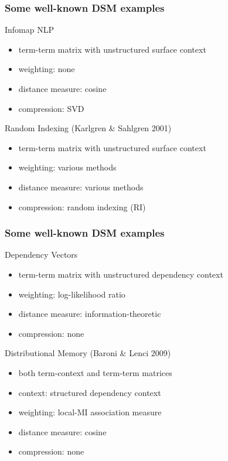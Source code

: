 \begin{frame}
  \frametitle{Some well-known DSM examples}

  \ungap
  \begin{block} {Infomap NLP \citep{Widdows:04}}
  \begin{itemize}
  \item term-term matrix with unstructured surface context
  \item weighting: none
  \item distance measure: cosine
  \item compression: SVD
  \end{itemize}
  \end{block}
 
  \begin{block} {Random Indexing (Karlgren \& Sahlgren 2001)}
    \begin{itemize}
    \item term-term matrix with unstructured surface context
    \item weighting: various methods 
    \item distance measure: various methods
    \item compression: random indexing (RI)
    \end{itemize}
  \end{block}
\end{frame}

\begin{frame}
  \frametitle{Some well-known DSM examples}

  \ungap
  \begin{block}{Dependency Vectors \citep{Pado:Lapata:07}}
  \begin{itemize}
  \item term-term matrix with unstructured dependency context
  \item weighting: log-likelihood ratio
  \item distance measure: information-theoretic \citep{Lin:98a}
  \item compression: none
  \end{itemize}
  \end{block}
 
 \begin{block} {Distributional Memory  (Baroni \& Lenci 2009)}
  \begin{itemize}
  \item both term-context and term-term matrices
  \item context: structured dependency context
  \item weighting: local-MI association measure
  \item distance measure: cosine
  \item compression: none
  \end{itemize}
  \end{block}
 \end{frame}


